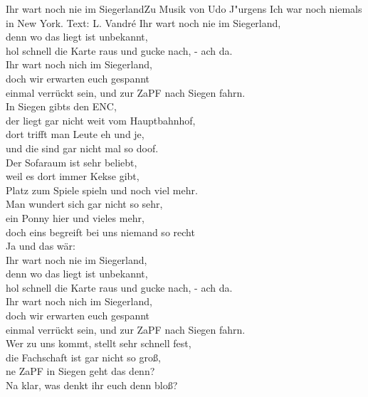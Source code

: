 
\begin{lied}{Ihr wart noch nie im Siegerland}{Zu Musik von Udo J"urgens \glqq Ich war noch niemals in New York\grqq. Text: L. Vandr\'e}
Ihr wart noch nie im Siegerland, \\
denn wo das liegt ist unbekannt, \\
hol schnell die Karte raus und gucke nach, - ach da. \\
Ihr wart noch nich im Siegerland, \\
doch wir erwarten euch gespannt \\
einmal verrückt sein, und zur ZaPF nach Siegen fahrn. \\
\vspace{1em}
In Siegen gibts den ENC, \\
der liegt gar nicht weit vom Hauptbahnhof, \\
dort trifft man Leute eh und je, \\
und die sind gar nicht mal so doof. \\
Der Sofaraum ist sehr beliebt, \\
weil es dort immer Kekse gibt, \\
Platz zum Spiele spieln und noch viel mehr. \\
Man wundert sich gar nicht so sehr, \\
ein Ponny hier und vieles mehr, \\
doch eins begreift bei uns niemand so recht \\
Ja und das wär: \\
\vspace{1em}
Ihr wart noch nie im Siegerland, \\
denn wo das liegt ist unbekannt, \\
hol schnell die Karte raus und gucke nach, - ach da. \\
Ihr wart noch nich im Siegerland, \\
doch wir erwarten euch gespannt \\
einmal verrückt sein, und zur ZaPF nach Siegen fahrn. \\
\vspace{1em}
Wer zu uns kommt, stellt sehr schnell fest, \\
die Fachschaft ist gar nicht so groß, \\
ne ZaPF in Siegen geht das denn? \\
Na klar, was denkt ihr euch denn bloß? \\

\end{lied}
